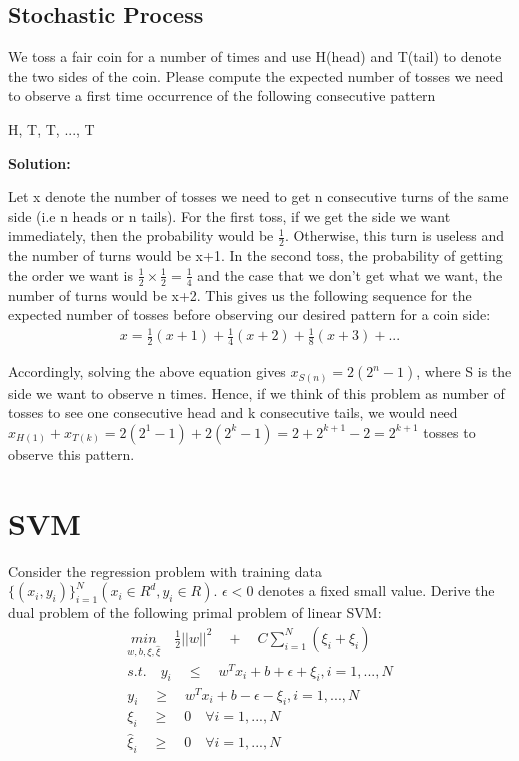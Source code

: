 \documentclass[12pt,a4paper]{article}
\begin{document}
	
	
	
	\subsection{Stochastic Process}
	\noindent We toss a fair coin for a number of times and use H(head) and T(tail) to denote the two sides of the coin. Please compute the expected number of tosses we need to observe a first time occurrence of the following consecutive pattern
	\begin{center}
		H, T, T, ..., T
	\end{center}
	\vspace{-0.2cm}
	
	\noindent \textbf{Solution:}
	\vspace{0.2cm}
	
	\noindent Let x denote the number of tosses we need to get n consecutive turns of the same side (i.e n heads or n tails). For the first toss, if we get the side we want immediately, then the probability would be $\frac{1}{2}$. Otherwise, this turn is useless and the number of turns would be x+1. In the second toss, the probability of getting the order we want is $\frac{1}{2}\times\frac{1}{2}=\frac{1}{4}$ and the case that we don't get what we want, the number of turns would be x+2. This gives us the following sequence for the expected number of tosses before observing our desired pattern for a coin side:
	\begin{align*}
		x=\frac{1}{2}(x+1)+\frac{1}{4}(x+2)+\frac{1}{8}(x+3)+...
	\end{align*}
	
	\noindent Accordingly, solving the above equation gives $x_{S(n)}=2(2^n-1)$, where S is the side we want to observe n times. Hence, if we think of this problem as number of tosses to see one consecutive head and k consecutive tails, we would need $x_{H(1)}+x_{T(k)}=2(2^1-1)+2(2^k-1)= 2+2^{k+1}-2 =2^{k+1}$ tosses to observe this pattern.
	
	\section{SVM}
	Consider the regression problem with training data $\{(x_i, y_i)\}_{i=1}^N (x_i \in R^d, y_i \in R)$. $\epsilon<0$ denotes a fixed small value. Derive the dual problem of the following primal problem of linear SVM:
	\begin{align*}
		\underset{w, b, \xi, \hat{\xi}}{min}\quad \frac{1}{2}||w||^2\quad+\quad C\sum_{i=1}^{N}(\xi_i+\hat{\xi}_i)\\
		s.t.\quad y_i\quad \leq \quad w^Tx_i+b+\epsilon+\xi_i, i=1,...,N \\	
		y_i\quad \geq\quad w^Tx_i+b-\epsilon-\xi_i, i=1,...,N\\
		\xi_i\quad\geq\quad 0\quad\forall i=1,...,N\qquad\qquad\quad\quad\\
		\hat{\xi}_i\quad\geq\quad 0\quad\forall i=1,...,N\qquad\qquad\quad\quad
	\end{align*}
	\vspace{-0.8cm}
	
\end{document}
